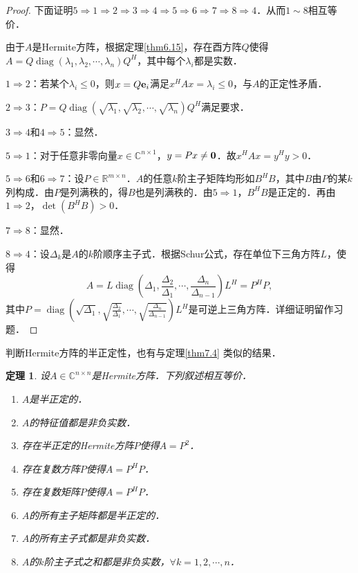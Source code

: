 \documentclass[a4paper,fontset=windows]{ctexbook}
\newtheorem{theorem}{定理}[chapter]
\theoremstyle{definition}
\DeclareMathOperator{\diag}{diag}
\renewcommand{\le}{\leqslant}
\begin{document}
\begin{proof}
下面证明$5\Rightarrow 1\Rightarrow 2\Rightarrow 3\Rightarrow 4\Rightarrow 5\Rightarrow 6\Rightarrow 7\Rightarrow 8\Rightarrow 4$．从而$1\sim 8$相互等价．

由于$A$是Hermite方阵，根据定理\ref{thm6.15}，存在酉方阵$Q$使得$A=Q\diag(\lambda_1,\lambda_2,\cdots,\lambda_n)Q^H$，其中每个$\lambda_i$都是实数．

$1\Rightarrow 2$：若某个$\lambda_i\le 0$，则$x=Q{\bf e}_i$满足$x^HAx=\lambda_i\le 0$，与$A$的正定性矛盾．

$2\Rightarrow 3$：$P=Q\diag(\sqrt{\lambda_1},\sqrt{\lambda_2},\cdots,\sqrt{\lambda_n})Q^H$满足要求．

$3\Rightarrow 4$和$4\Rightarrow 5$：显然．

$5\Rightarrow 1$：对于任意非零向量$x\in\mathbb{C}^{n\times 1}$，$y=Px\ne{\bf 0}$．故$x^HAx=y^Hy>0$．

$5\Rightarrow 6$和$6\Rightarrow 7$：设$P\in\mathbb{R}^{m\times n}$．$A$的任意$k$阶主子矩阵均形如$B^HB$，其中$B$由$P$的某$k$列构成．由$P$是列满秩的，得$B$也是列满秩的．由$5\Rightarrow 1$，$B^HB$是正定的．再由$1\Rightarrow 2$，$\det(B^HB)>0$．

$7\Rightarrow 8$：显然．

$8\Rightarrow 4$：设$\Delta_k$是$A$的$k$阶顺序主子式．根据Schur公式，存在单位下三角方阵$L$，使得
$$A=L\diag\left(\Delta_1,\frac{\Delta_2}{\Delta_1},\cdots,\frac{\Delta_n}{\Delta_{n-1}}\right)L^H=P^HP,$$
其中$P=\diag\left(\sqrt{\Delta_1},\sqrt{\frac{\Delta_2}{\Delta_1}},\cdots,\sqrt{\frac{\Delta_n}{\Delta_{n-1}}}\right)L^H$是可逆上三角方阵．详细证明留作习题．
\end{proof}

判断Hermite方阵的半正定性，也有与定理\ref{thm7.4} 类似的结果．

\begin{theorem}\label{thm7.5}
设$A\in\mathbb{C}^{n\times n}$是Hermite方阵．下列叙述相互等价．\begin{enumerate}
\item $A$是半正定的．
\item $A$的特征值都是非负实数．
\item 存在半正定的Hermite方阵$P$使得$A=P^2$．
\item 存在复数方阵$P$使得$A=P^HP$．
\item 存在复数矩阵$P$使得$A=P^HP$．
\item $A$的所有主子矩阵都是半正定的．
\item $A$的所有主子式都是非负实数．
\item $A$的$k$阶主子式之和都是非负实数，$\forall k=1,2,\cdots,n$．
\end{enumerate}
\end{theorem}
\end{document}
